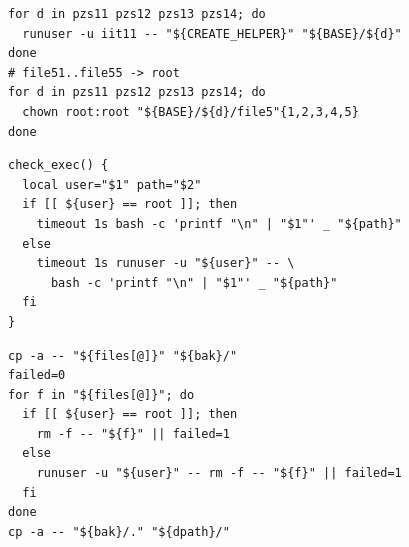 \begin{lstlisting}[caption={Создание файлов от имени iit11},label={lst:p1-files}]
for d in pzs11 pzs12 pzs13 pzs14; do
  runuser -u iit11 -- "${CREATE_HELPER}" "${BASE}/${d}"
done
# file51..file55 -> root
for d in pzs11 pzs12 pzs13 pzs14; do
  chown root:root "${BASE}/${d}/file5"{1,2,3,4,5}
done
\end{lstlisting}

\begin{lstlisting}[caption={Исполнение файла: реальный запуск, не проверка бита x},label={lst:p1-exec}]
check_exec() {
  local user="$1" path="$2"
  if [[ ${user} == root ]]; then
    timeout 1s bash -c 'printf "\n" | "$1"' _ "${path}"
  else
    timeout 1s runuser -u "${user}" -- \
      bash -c 'printf "\n" | "$1"' _ "${path}"
  fi
}
\end{lstlisting}

\begin{lstlisting}[caption={Удаление существующих file* с восстановлением из копии},label={lst:p1-rm}]
cp -a -- "${files[@]}" "${bak}/"
failed=0
for f in "${files[@]}"; do
  if [[ ${user} == root ]]; then
    rm -f -- "${f}" || failed=1
  else
    runuser -u "${user}" -- rm -f -- "${f}" || failed=1
  fi
done
cp -a -- "${bak}/." "${dpath}/"
\end{lstlisting}
